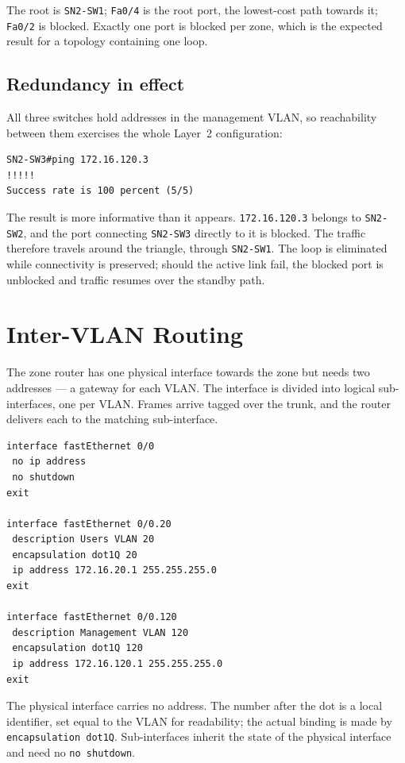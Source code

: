 \documentclass[12pt,a4paper]{article}
\begin{document}
The root is \texttt{SN2-SW1}; \texttt{Fa0/4} is the root port, the lowest-cost
path towards it; \texttt{Fa0/2} is blocked. Exactly one port is blocked per zone,
which is the expected result for a topology containing one loop.

\subsection{Redundancy in effect}

All three switches hold addresses in the management VLAN, so reachability between
them exercises the whole Layer~2 configuration:

\begin{lstlisting}
SN2-SW3#ping 172.16.120.3
!!!!!
Success rate is 100 percent (5/5)
\end{lstlisting}

The result is more informative than it appears. \texttt{172.16.120.3} belongs to
\texttt{SN2-SW2}, and the port connecting \texttt{SN2-SW3} directly to it is
blocked. The traffic therefore travels around the triangle, through
\texttt{SN2-SW1}. The loop is eliminated while connectivity is preserved; should
the active link fail, the blocked port is unblocked and traffic resumes over the
standby path.

\section{Inter-VLAN Routing}

The zone router has one physical interface towards the zone but needs two
addresses --- a gateway for each VLAN. The interface is divided into logical
sub-interfaces, one per VLAN. Frames arrive tagged over the trunk, and the router
delivers each to the matching sub-interface.

\begin{lstlisting}
interface fastEthernet 0/0
 no ip address
 no shutdown
exit

interface fastEthernet 0/0.20
 description Users VLAN 20
 encapsulation dot1Q 20
 ip address 172.16.20.1 255.255.255.0
exit

interface fastEthernet 0/0.120
 description Management VLAN 120
 encapsulation dot1Q 120
 ip address 172.16.120.1 255.255.255.0
exit
\end{lstlisting}

The physical interface carries no address. The number after the dot is a local
identifier, set equal to the VLAN for readability; the actual binding is made by
\texttt{encapsulation dot1Q}. Sub-interfaces inherit the state of the physical
interface and need no \texttt{no shutdown}.
\end{document}
